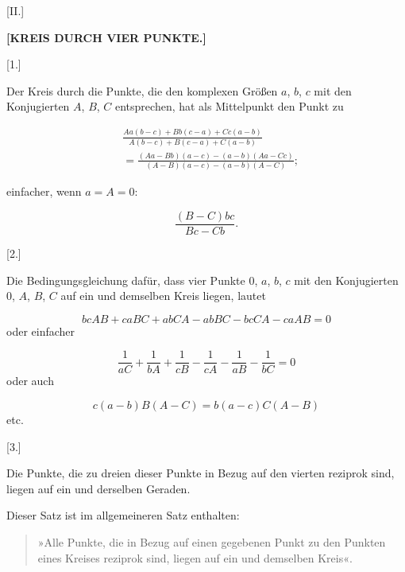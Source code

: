 
\begin{center}
[II.]

\textbf{[KREIS DURCH VIER PUNKTE.]}

[1.]
\end{center}

Der Kreis durch die Punkte, die den komplexen Größen $a$, $b$, $c$ mit den Konjugierten $A$, $B$, $C$ entsprechen, hat als Mittelpunkt den Punkt zu

\[
\begin{aligned}
&\frac{Aa(b-c)+Bb(c-a)+Cc(a-b)}{A(b-c)+B(c-a)+C(a-b)} \\
&= \frac{(Aa-Bb)(a-c)-(a-b)(Aa-Cc)}{(A-B)(a-c)-(a-b)(A-C)};
\end{aligned}
\]

einfacher, wenn $a=A=0$:

\[
\frac{(B-C)bc}{Bc-Cb}.
\]

\begin{center}
[2.]
\end{center}

Die Bedingungsgleichung dafür, dass vier Punkte $0$, $a$, $b$, $c$ mit den Konjugierten
$0$, $A$, $B$, $C$ auf ein und demselben Kreis liegen, lautet

\[
bcAB+caBC+abCA-abBC-bcCA-caAB = 0
\]
oder einfacher

\[
\frac{1}{aC}+\frac{1}{bA}+\frac{1}{cB}-\frac{1}{cA}-\frac{1}{aB}-\frac{1}{bC} = 0
\]
oder auch

\[
c(a-b)B(A-C) = b(a-c)C(A-B)
\]
etc.

\begin{center}
[3.]
\end{center}

Die Punkte, die zu dreien dieser Punkte in Bezug auf den vierten
reziprok sind, liegen auf ein und derselben Geraden.

Dieser Satz ist im allgemeineren Satz enthalten:

\begin{quote}
»Alle Punkte, die in Bezug auf einen gegebenen Punkt zu den
Punkten eines Kreises reziprok sind, liegen auf ein und demselben Kreis«.
\end{quote}
